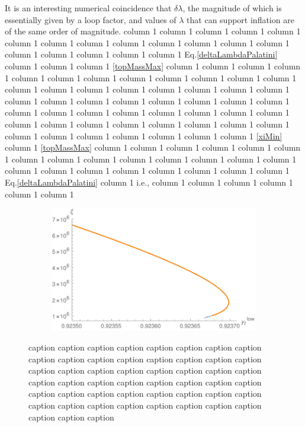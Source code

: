 \documentclass[a4paper,11pt]{article}
\makeatletter
\newcommand*{\ie}{i.e., }
\newcommand*{\Eq}{Eq.\@\xspace}
\makeatother
\begin{document}
%
{It is an interesting numerical coincidence that $\delta \lambda$, the magnitude of which is essentially given by a loop factor, and values of $\lambda$ that can support inflation are of the same order of magnitude.}
%
  column 1  column 1  column 1  column 1  column 1   column 1  column 1  column 1  column 1  column 1  column 1  column 1  column 1  column 1   column 1  column 1   column 1  column 1 \Eq \eqref{deltaLambdaPalatini}  column 1  column 1  column 1 \eqref{topMassMax}  column 1  column 1   column 1  column 1  column 1  column 1  column 1  column 1  
  column 1  column 1  column 1  column 1  column 1  column 1  column 1   column 1     column 1  column 1  column 1  column 1  column 1  column 1  column 1  column 1  column 1  column 1  column 1  column 1  column 1  column 1   column 1  column 1  column 1   column 1  column 1  column 1   column 1  column 1  column 1  column 1  column 1  column 1  column 1   column 1   column 1  column 1  column 1   column 1   column 1  column 1  column 1 \eqref{xiMin}  column 1 \eqref{topMassMax}  column 1  column 1   column 1   column 1  column 1  column 1  column 1  column 1  column 1  column 1   column 1  column 1  column 1  column 1   column 1  column 1  column 1   column 1  column 1  column 1  column 1  column 1 \Eq \eqref{deltaLambdaPalatini}  column 1 \ie   column 1  column 1  column 1  column 1  column 1  column 1   \begin{figure}
	\centering 
	\begin{subfigure}{0.6\textwidth}
		\includegraphics[width=\textwidth]{xiOfYt0.pdf}
	\end{subfigure}
	\hspace{0.02\textwidth}
	\caption{  caption  caption  caption   caption  caption  caption  caption  caption  caption  caption  caption   caption  caption  caption  caption  caption  caption  caption  caption  caption  caption  caption  caption  caption   caption  caption  caption  caption  caption  caption  caption  caption  caption  caption  caption  caption  caption  caption  caption  caption  caption  caption  caption  caption  caption  caption  caption   caption  caption  caption  caption }
			\label{sfig:xiOfLambda0}
\end{figure} 
\end{document}

